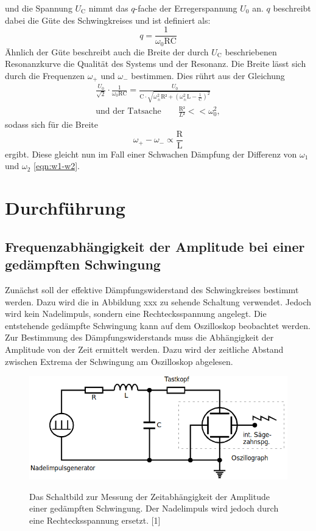 \documentclass[titlepage = firstcover]{scrartcl}
\begin{document}
            und die Spannung $U_{\text{C}}$ nimmt das $q$-fache der Erregerspannung $U_0$ an.
            $q$ beschreibt dabei die Güte des Schwingkreises und ist definiert als:
            \begin{equation}
                q = \frac{1}{\omega_0 \text{RC}}
                \label{eqn:Güte}
            \end{equation}
            Ähnlich der Güte beschreibt auch die Breite der durch $U_{\text{C}}$ beschriebenen Resonanzkurve die Qualität des Systems und der Resonanz. 
            Die Breite lässt sich durch die Frequenzen $\omega_+$ und $\omega_-$ bestimmen. Dies rührt aus der Gleichung
            \begin{align*}
                \frac{U_0}{\sqrt{2}} \cdot \frac{1}{\omega_0\text{RC}} = \frac{U_0}{\text{C}\cdot \sqrt{\omega_{\pm}^2\text{R²} + \left(\omega_{\pm}^2\text{L}-\frac{1}{\text{C}}\right)^2}} \\
                \text{und der Tatsache} \qquad \frac{\text{R²}}{L²} << \omega_0^2,
            \end{align*} 
            sodass sich für die Breite
            \begin{equation}
                \omega_+ - \omega_- \propto \frac{\text{R}}{\text{L}}
                \label{eqn:breiteResonanzkurve}
            \end{equation}
            ergibt. Diese gleicht nun im Fall einer Schwachen Dämpfung der Differenz von $\omega_1$ und $\omega_2$ \ref{eqn:w1-w2}.

    \section{Durchführung}
        \subsection{Frequenzabhängigkeit der Amplitude bei einer gedämpften Schwingung}
            Zunächst soll der effektive Dämpfungswiderstand des Schwingkreises bestimmt werden. Dazu wird die in Abbildung xxx zu sehende Schaltung verwendet.
            Jedoch wird kein Nadelimpuls, sondern eine Rechtecksspannung angelegt. Die entstehende gedämpfte Schwingung kann auf dem Oszilloskop beobachtet 
            werden. Zur Bestimmung des Dämpfungswiderstands muss die Abhängigkeit der Amplitude von der Zeit ermittelt werden. Dazu wird der zeitliche Abstand
            zwischen Extrema der Schwingung am Oszilloskop abgelesen.
            \begin{figure}[h]
                \centering
                \caption{Das Schaltbild zur Messung der Zeitabhängigkeit der Amplitude einer gedämpften Schwingung. Der Nadelimpuls wird jedoch durch eine Rechtecksspannung ersetzt. [1]}
                \includegraphics[width = 0.4\linewidth]{MessungA.png}
                \label{fig:MessungA}
              \end{figure}
              \FloatBarrier
\end{document}
